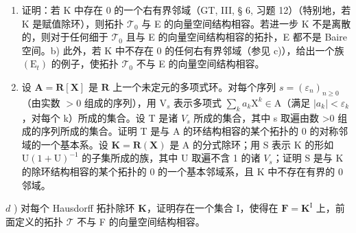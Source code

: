 \begin{enumerate}
\def\labelenumi{\alph{enumi})}
\item
  证明：若 K 中存在 0 的一个右有界邻域（GT, III, § 6, 习题 12）（特别地，若 K 是赋值除环），则拓扑 \(\mathcal{T}_0\) 与 E 的向量空间结构相容。若进一步 K 不是离散的，则对于任何细于 \(\mathcal{T}_0\) 且与 E 的向量空间结构相容的拓扑，E 都不是 Baire 空间。b) 此外，若 K 中不存在 0 的任何右有界邻域（参见 c)），给出一个族 \((\mathrm{E}_t)\) 的例子，使拓扑 \(\mathcal{T}_0\) 不与 E 的向量空间结构相容。
\item
  设 \(\mathbf{A} = \mathbf{R}[\mathbf{X}]\) 是 \(\mathbf{R}\) 上一个未定元的多项式环。对每个序列 \(s = (\varepsilon_n)_{n\geqslant 0}\)（由实数 \(>0\) 组成的序列），用 \(\mathrm{V}_s\) 表示多项式 \(\sum_k a_k\mathrm{X}^k\in \mathrm{A}\)（满足 \(|a_k| < \varepsilon_k\)，对每个 k）所成的集合。设 T 是诸 \(V_{s}\) 所成的集合，其中 s 取遍由数 \textgreater0 组成的序列所成的集合。证明 T 是与 A 的环结构相容的某个拓扑的 0 的对称邻域的一个基本系。设 \(\mathbf{K} = \mathbf{R}(\mathbf{X})\) 是 A 的分式除环；用 S 表示 K 的形如 \(\mathrm{U}(1 + \mathrm{U})^{-1}\) 的子集所成的族，其中 U 取遍不含 1 的诸 \(V_{s}\)；证明 S 是与 K 的除环结构相容的某个拓扑的 0 的一个基本邻域系，且 K 中不存在有界的 0 邻域。
\end{enumerate}

\(d\) ) 对每个 Hausdorff 拓扑除环 \(\mathbf{K}\)，证明存在一个集合 I，使得在 \(\mathbf{F} = \mathbf{K}^{\mathrm{I}}\) 上，前面定义的拓扑 \(\mathcal{T}\) 不与 F 的向量空间结构相容。
\relax{}

